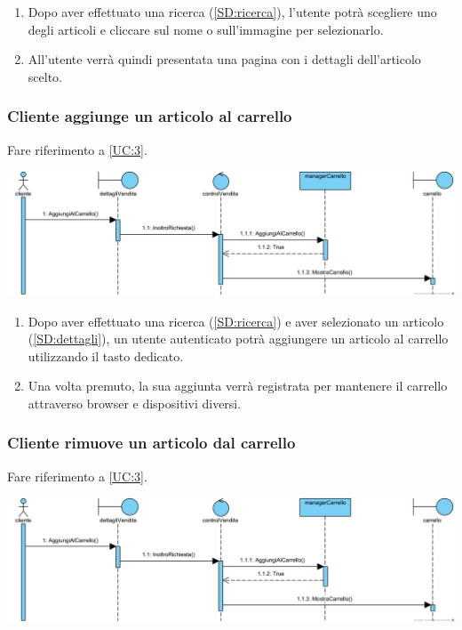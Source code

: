 \documentclass[12pt,a4paper]{article}
\begin{document}
\begin{enumerate}
\item Dopo aver effettuato una ricerca (\ref{SD:ricerca}), l'utente potrà scegliere uno degli articoli e cliccare sul nome o sull'immagine per selezionarlo.
\item All'utente verrà quindi presentata una pagina con i dettagli dell'articolo scelto.
\end{enumerate}

\newpage

\subsubsection{Cliente aggiunge un articolo al carrello}
\label{SD:aggiunta}

Fare riferimento a \ref{UC:3}. \\

\begin{center}
\includegraphics[width=\textwidth]{SequenceDiagram/ClienteAggiungeAlCarrello}
\end{center}

\begin{enumerate}
\item Dopo aver effettuato una ricerca (\ref{SD:ricerca}) e aver selezionato un articolo (\ref{SD:dettagli}), un utente autenticato potrà aggiungere un articolo al carrello utilizzando il tasto dedicato.
\item Una volta premuto, la sua aggiunta verrà registrata per mantenere il carrello attraverso browser e dispositivi diversi.
\end{enumerate}

\subsubsection{Cliente rimuove un articolo dal carrello}
\label{SD:rimozione}

Fare riferimento a \ref{UC:3}. \\

\begin{center}
\includegraphics[width=\textwidth]{SequenceDiagram/ClienteAggiungeAlCarrello}
\end{center}
\end{document}

